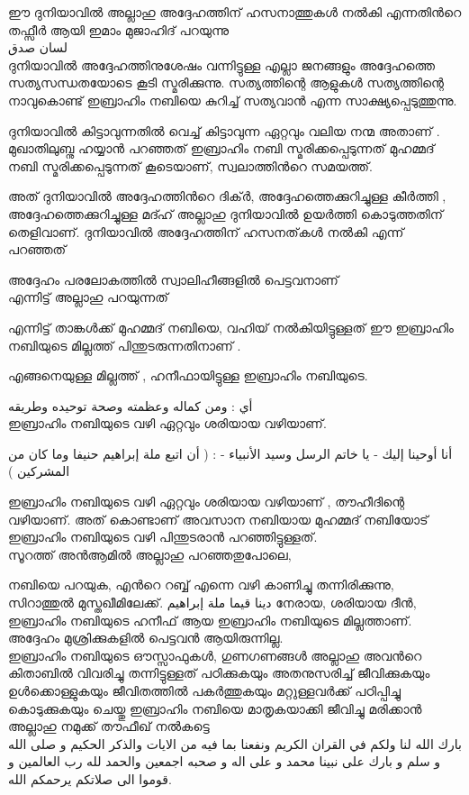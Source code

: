ഈ ദുനിയാവിൽ അല്ലാഹു അദ്ദേഹത്തിന് ഹസനാത്തുകൾ നൽകി എന്നതിൻറെ തഫ്സീർ ആയി ഇമാം മുജാഹിദ് പറയുന്നു \\

\textarabic{ لسان صدق} \\


ദുനിയാവിൽ അദ്ദേഹത്തിനുശേഷം വന്നിട്ടുള്ള എല്ലാ ജനങ്ങളും അദ്ദേഹത്തെ സത്യസന്ധതയോടെ കൂടി സ്മരിക്കുന്നു. 
സത്യത്തിന്റെ ആളുകൾ സത്യത്തിന്റെ നാവുകൊണ്ട് ഇബ്രാഹിം നബിയെ കുറിച്ച് സത്യവാൻ എന്ന സാക്ഷ്യപ്പെടുത്തുന്നു. 

ദുനിയാവിൽ കിട്ടാവുന്നതിൽ വെച്ച് കിട്ടാവുന്ന ഏറ്റവും വലിയ നന്മ അതാണ് . \\

മുഖാതിലുബ്നു ഹയ്യാൻ പറഞ്ഞത് 
ഇബ്രാഹിം നബി സ്മരിക്കപ്പെടുന്നത് മുഹമ്മദ് നബി സ്മരിക്കപ്പെടുന്നത് കൂടെയാണ്, സ്വലാത്തിൻറെ സമയത്ത്. 

അത്  ദുനിയാവിൽ അദ്ദേഹത്തിൻറെ ദിക്ർ,  അദ്ദേഹത്തെക്കുറിച്ചുള്ള കീർത്തി , അദ്ദേഹത്തെക്കുറിച്ചുള്ള മദ്ഹ് അല്ലാഹു 
ദുനിയാവിൽ 
ഉയർത്തി കൊടുത്തതിന് തെളിവാണ്.  ദുനിയാവിൽ അദ്ദേഹത്തിന് ഹസനത്‌കൾ  നൽകി എന്ന് പറഞ്ഞത് 


അദ്ദേഹം പരലോകത്തിൽ സ്വാലിഹീങ്ങളിൽ പെട്ടവനാണ് \\

എന്നിട്ട് അല്ലാഹു പറയുന്നത് 

    \textarabic{\quranayah[16][123]} 
എന്നിട്ട് താങ്കൾക്ക് മുഹമ്മദ് നബിയെ,  വഹിയ് നൽകിയിട്ടുള്ളത് ഈ ഇബ്രാഹിം നബിയുടെ മില്ലത്ത് പിന്തുടരുന്നതിനാണ് . 

എങ്ങനെയുള്ള മില്ലത്ത് , ഹനീഫായിട്ടുള്ള ഇബ്രാഹിം നബിയുടെ. 

\textarabic{أي : ومن كماله وعظمته وصحة توحيده وطريقه} \\
ഇബ്രാഹിം നബിയുടെ വഴി ഏറ്റവും ശരിയായ വഴിയാണ്. 

\textarabic{ أنا أوحينا إليك - يا خاتم الرسل وسيد الأنبياء - : ( أن اتبع ملة إبراهيم حنيفا وما كان من المشركين )}

ഇബ്രാഹിം നബിയുടെ വഴി ഏറ്റവും ശരിയായ വഴിയാണ് , തൗഹീദിന്റെ വഴിയാണ്. അത് കൊണ്ടാണ് അവസാന നബിയായ മുഹമ്മദ് നബിയോട് ഇബ്രാഹിം നബിയുടെ വഴി പിന്തുടരാൻ പറഞ്ഞിട്ടുള്ളത്. \\

 സൂറത്ത് അൻആമിൽ  അല്ലാഹു പറഞ്ഞതുപോലെ, 

    \textarabic{\quranayah[6][161]} 

നബിയെ പറയുക, എൻറെ റബ്ബ് 
എന്നെ വഴി കാണിച്ചു തന്നിരിക്കുന്നു, 
സിറാത്തുൽ മുസ്തഖീമിലേക്ക്. 
\textarabic{دينا قيما ملة إبراهيم}
നേരായ, ശരിയായ ദീൻ,  ഇബ്രാഹിം നബിയുടെ ഹനീഫ് ആയ ഇബ്രാഹിം നബിയുടെ മില്ലത്താണ്. 
അദ്ദേഹം മുശ്രിക്കുകളിൽ പെട്ടവൻ ആയിരുന്നില്ല. \\


ഇബ്രാഹിം നബിയുടെ ഔസ്സാഫുകൾ, ഗുണഗണങ്ങൾ 
അല്ലാഹു അവൻറെ കിതാബിൽ വിവരിച്ചു തന്നിട്ടുള്ളത് പഠിക്കുകയും അതനുസരിച്ച് ജീവിക്കുകയും 
ഉൾക്കൊള്ളുകയും ജീവിതത്തിൽ പകർത്തുകയും മറ്റുള്ളവർക്ക് പഠിപ്പിച്ചു കൊടുക്കുകയും ചെയ്തു ഇബ്രാഹിം നബിയെ മാതൃകയാക്കി ജീവിച്ചു മരിക്കാൻ അല്ലാഹു നമുക്ക് തൗഫീഖ് നൽകട്ടെ \\


\textarabic{بارك الله لنا ولكم في القران الكريم ونفعنا بما فيه من الايات والذكر الحكيم و صلى الله و سلم و بارك على نبينا محمد و على اله و صحبه اجمعين والحمد لله رب العالمين و قوموا الى صلاتكم يرحمكم الله.}


 